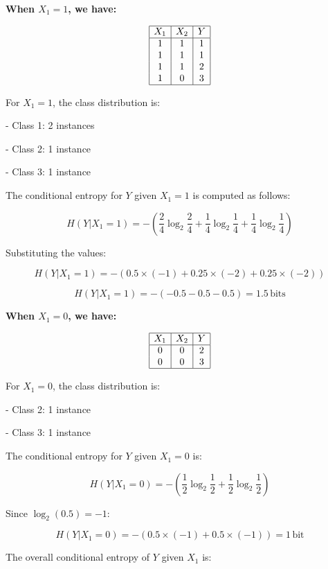 \documentclass[12pt]{article}
\begin{document}
\textbf{When $X_1 = 1$, we have:}

\[
  \begin{array}{|c|c|c|}
    \hline
    X_1 & X_2 & Y \\
    \hline
    1   & 1   & 1 \\
    1   & 1   & 1 \\
    1   & 1   & 2 \\
    1   & 0   & 3 \\
    \hline
  \end{array}
\]

For \( X_1 = 1 \), the class distribution is:

- Class 1: 2 instances

- Class 2: 1 instance

- Class 3: 1 instance

The conditional entropy for \( Y \) given \( X_1 = 1 \) is computed as follows:

\[
  H(Y|X_1 = 1) = -\left( \frac{2}{4} \log_2 \frac{2}{4} + \frac{1}{4} \log_2 \frac{1}{4} + \frac{1}{4} \log_2 \frac{1}{4} \right)
\]

Substituting the values:

\[
  H(Y|X_1 = 1) = -\left( 0.5 \times (-1) + 0.25 \times (-2) + 0.25 \times (-2) \right)
\]

\[
  H(Y|X_1 = 1) = -( -0.5 - 0.5 - 0.5 ) = 1.5 \, \text{bits}
\]

\textbf{When $X_1 = 0$, we have:}

\[
  \begin{array}{|c|c|c|}
    \hline
    X_1 & X_2 & Y \\
    \hline
    0   & 0   & 2 \\
    0   & 0   & 3 \\
    \hline
  \end{array}
\]

For \( X_1 = 0 \), the class distribution is:

- Class 2: 1 instance

- Class 3: 1 instance

The conditional entropy for \( Y \) given \( X_1 = 0 \) is:

\[
  H(Y|X_1 = 0) = -\left( \frac{1}{2} \log_2 \frac{1}{2} + \frac{1}{2} \log_2 \frac{1}{2} \right)
\]

Since \( \log_2(0.5) = -1 \):

\[
  H(Y|X_1 = 0) = -(0.5 \times (-1) + 0.5 \times (-1)) = 1 \, \text{bit}
\]

The overall conditional entropy of \( Y \) given \( X_1 \) is:
\end{document}
